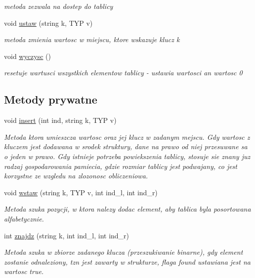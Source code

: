 \begin{DoxyCompactItemize}
\begin{DoxyCompactList}\small\item\em metoda zezwala na dostep do tablicy \end{DoxyCompactList}\item 
void \hyperlink{classtablica__asocjacyjna_a2ffe030234f0618af8a24020e909dda5}{ustaw} (string k, T\-Y\-P v)
\begin{DoxyCompactList}\small\item\em metoda zmienia wartosc w miejscu, ktore wskazuje klucz k \end{DoxyCompactList}\item 
void \hyperlink{classtablica__asocjacyjna_aad385ad010e6f0c5152b9b2cc187e15b}{wyczysc} ()
\begin{DoxyCompactList}\small\item\em resetuje wartusci wszystkich elementow tablicy -\/ ustawia wartosci an wartosc 0 \end{DoxyCompactList}\end{DoxyCompactItemize}
\subsection*{Metody prywatne}
\begin{DoxyCompactItemize}
\item 
void \hyperlink{classtablica__asocjacyjna_a9fc42088f50eca25e7ae4ce8c84ddf4d}{insert} (int ind, string k, T\-Y\-P v)
\begin{DoxyCompactList}\small\item\em Metoda ktora umieszcza wartosc oraz jej klucz w zadanym mejscu. Gdy wartosc z kluczem jest dodawana w srodek struktury, dane na prawo od niej przesuwane sa o jeden w prawo. Gdy istnieje potrzeba powiekszenia tablicy, stosuje sie znany juz radzaj gospodarowania pamiecia, gdzie rozmiar tablicy jest podwajany, co jest korzystne ze wzgledu na zlozonosc obliczeniowa. \end{DoxyCompactList}\item 
void \hyperlink{classtablica__asocjacyjna_a5da9eecc7f4e0d7bcf31e8c5c7c49d06}{wstaw} (string k, T\-Y\-P v, int ind\-\_\-l, int ind\-\_\-r)
\begin{DoxyCompactList}\small\item\em Metoda szuka pozycji, w ktora nalezy dodac element, aby tablica byla posortowana alfabetycznie. \end{DoxyCompactList}\item 
int \hyperlink{classtablica__asocjacyjna_a70a184c5358e47655211e68925c2e12e}{znajdz} (string k, int ind\-\_\-l, int ind\-\_\-r)
\begin{DoxyCompactList}\small\item\em Metoda szuka w zbiorze zadanego klucza (przeszukiwanie binarne), gdy element zostanie odnaleziony, tzn jest zawarty w strukturze, flaga found ustawiana jest na wartosc true. \end{DoxyCompactList}\end{DoxyCompactItemize}
